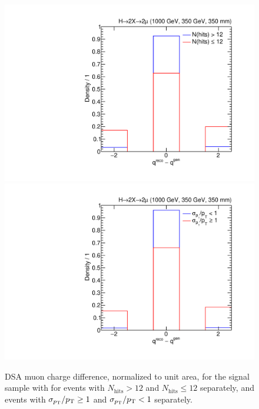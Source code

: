 \begin{figure}[htpb]
  \centering
  \includegraphics[width=\DSquareWidth]{figures/displaced/QCUTRES_Sig_qdiff_hits_1000_350_350.pdf}
  \hspace*{-2em}
  \includegraphics[width=\DSquareWidth]{figures/displaced/QCUTRES_Sig_qdiff_fpte_1000_350_350.pdf}
  \caption[DSA muon charge difference with and without selections on $N_\text{hits}$ and $\pTErr/\pT$.]{DSA muon charge difference, normalized to unit area, for the \twoMu signal sample with  for  events with $N_\text{hits} > 12$ and $N_\text{hits} \leq 12$ separately, and  events with $\sigma_{p_{\mathrm{T}}}/p_{\mathrm{T}} \geq 1$ and $\sigma_{p_{\mathrm{T}}}/p_{\mathrm{T}} < 1$ separately.}
  \label{fig:dd:QCUT_QDIFF}
\end{figure}

